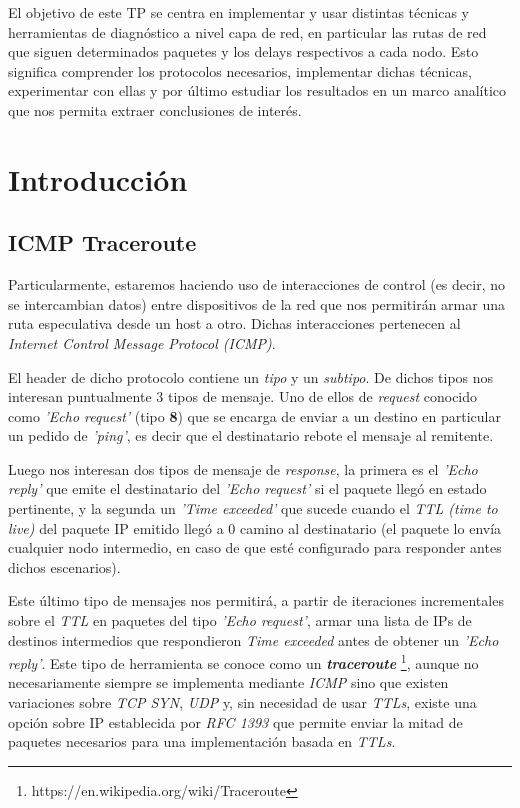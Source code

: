 El objetivo de este TP se centra en implementar y usar distintas técnicas y herramientas de diagnóstico a nivel capa de red, en particular las rutas de red que siguen determinados paquetes y los delays respectivos a cada nodo. Esto significa comprender los protocolos necesarios, implementar dichas técnicas, experimentar con ellas y por último estudiar los resultados en un marco analítico que nos permita extraer conclusiones de interés. 

\section{Introducción}
\subsection{ICMP Traceroute}

Particularmente, estaremos haciendo uso de interacciones de control (es decir, no se intercambian datos)  entre dispositivos de la red que nos permitirán armar una ruta especulativa desde un host a otro. Dichas interacciones pertenecen al \emph{Internet Control Message Protocol (ICMP)}.

El header de dicho protocolo contiene un \emph{tipo} y un \emph{subtipo}. De dichos tipos nos interesan puntualmente 3 tipos de mensaje. Uno de ellos de \emph{request} conocido como \emph{'Echo request'} (tipo \textbf{8}) que se encarga de enviar a un destino en particular un pedido de \emph{'ping'}, es decir que el destinatario rebote el mensaje al remitente.

Luego nos interesan dos tipos de mensaje de \emph{response}, la primera es el \emph{'Echo reply'} que emite el destinatario del \emph{'Echo request'} si el paquete llegó en estado pertinente, y la segunda un \emph{'Time exceeded'} que sucede cuando el \emph{TTL (time to live)} del paquete IP emitido llegó a 0 camino al destinatario (el paquete lo envía cualquier nodo intermedio, en caso de que esté configurado para responder antes dichos escenarios).

Este último tipo de mensajes nos permitirá, a partir de iteraciones incrementales sobre el \emph{TTL} en paquetes del tipo \emph{'Echo request'}, armar una lista de IPs de destinos intermedios que respondieron \emph{Time exceeded} antes de obtener un \emph{'Echo reply'}. Este tipo de herramienta se conoce como un \emph{\textbf{traceroute}} \footnote{ https://en.wikipedia.org/wiki/Traceroute}, aunque no necesariamente siempre se implementa mediante \emph{ICMP} sino que existen variaciones sobre \emph{TCP SYN}, \emph{UDP} y, sin necesidad de usar \emph{TTLs}, existe una opción sobre IP establecida por \emph{RFC 1393} que permite enviar la mitad de paquetes necesarios para una implementación basada en \emph{TTLs}. 

